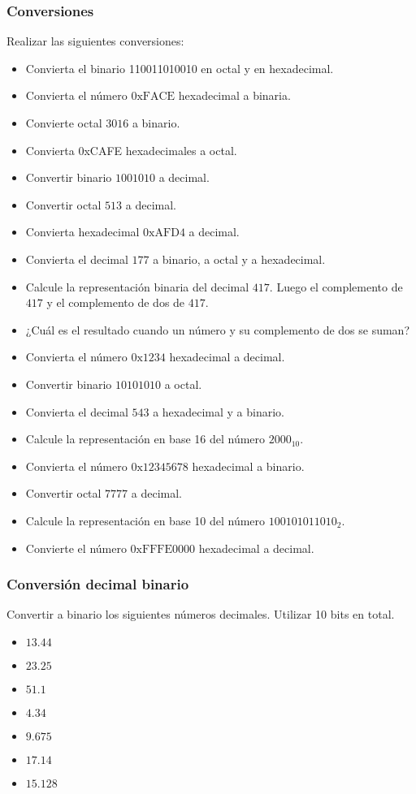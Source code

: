 \subsubsection{Conversiones}
Realizar las siguientes conversiones:
\begin{itemize}
  \item Convierta el binario 110011010010 en octal y en hexadecimal.
  \item Convierta el número $\mathrm{0xFACE}$ hexadecimal a binaria.
  \item Convierte octal $\mathrm{3016}$ a binario.
  \item Convierta 0xCAFE hexadecimales a octal.
  \item Convertir binario $\mathrm{1001010}$ a decimal.
  \item Convertir octal $\mathrm{513}$ a decimal.
  \item Convierta hexadecimal $\mathrm{0xAFD4}$ a decimal.
  \item Convierta el decimal $\mathrm{177}$ a binario, a octal y a hexadecimal.
  \item Calcule la representación binaria del decimal $\mathrm{417}$. Luego el complemento de $\mathrm{417}$ y el complemento de dos de $\mathrm{417}$.
  \item ¿Cuál es el resultado cuando un número y su complemento de dos se suman?
  \item Convierta el número $\mathrm{0x1234}$ hexadecimal a decimal.
  \item Convertir binario $\mathrm{10101010}$ a octal.
  \item Convierta el decimal $\mathrm{543}$ a hexadecimal y a binario.
  \item Calcule la representación en base 16 del número $\mathrm{2000}_{10}$.
  \item Convierta el número $\mathrm{0x12345678}$ hexadecimal a binario.
  \item Convertir octal $\mathrm{7777}$ a decimal.
  \item Calcule la representación en base 10 del número $\mathrm{100101011010}_{2}$.
  \item Convierte el número $\mathrm{0xFFFE0000}$ hexadecimal a decimal.
\end{itemize}

\subsubsection{Conversión decimal binario}
Convertir a binario los siguientes números decimales. Utilizar 10 bits en total.
\begin{itemize}
  \item $13.44$
  \item $23.25$
  \item $51.1$
  \item $4.34$
  \item $9.675$
  \item $17.14$
  \item $15.128$
\end{itemize}

